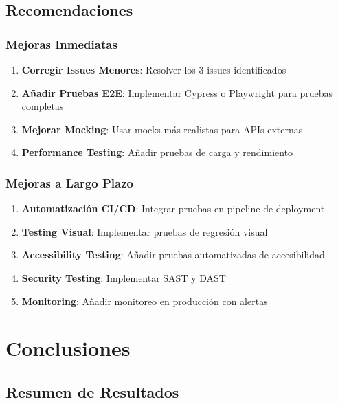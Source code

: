 \documentclass[12pt,a4paper]{article}
\begin{document}
\subsection{Recomendaciones}

\subsubsection{Mejoras Inmediatas}

\begin{enumerate}
    \item \textbf{Corregir Issues Menores}: Resolver los 3 issues identificados
    \item \textbf{Añadir Pruebas E2E}: Implementar Cypress o Playwright para pruebas completas
    \item \textbf{Mejorar Mocking}: Usar mocks más realistas para APIs externas
    \item \textbf{Performance Testing}: Añadir pruebas de carga y rendimiento
\end{enumerate}

\subsubsection{Mejoras a Largo Plazo}

\begin{enumerate}
    \item \textbf{Automatización CI/CD}: Integrar pruebas en pipeline de deployment
    \item \textbf{Testing Visual}: Implementar pruebas de regresión visual
    \item \textbf{Accessibility Testing}: Añadir pruebas automatizadas de accesibilidad
    \item \textbf{Security Testing}: Implementar SAST y DAST
    \item \textbf{Monitoring}: Añadir monitoreo en producción con alertas
\end{enumerate}

\section{Conclusiones}

\subsection{Resumen de Resultados}
\end{document}
